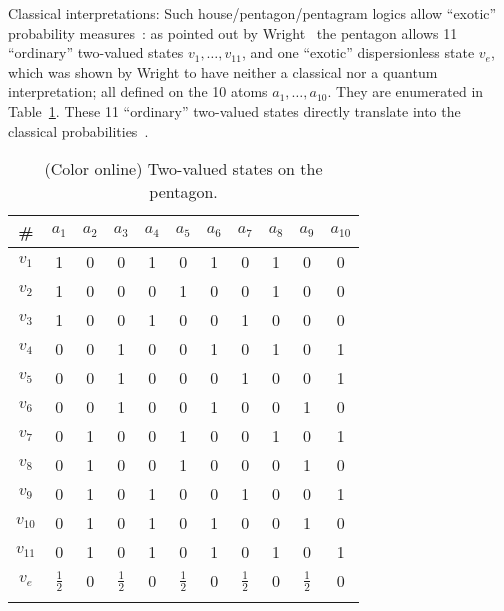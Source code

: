 Classical interpretations:
Such house/pentagon/pentagram logics allow ``exotic'' probability measures~\cite{wright:pent}:
as pointed out by Wright~\cite[p~268]{wright:pent} the pentagon allows 11 ``ordinary'' two-valued states $v_1,\ldots ,v_{11}$,
and one ``exotic'' dispersionless state $v_e$,
which was shown by Wright to have neither a classical nor a quantum interpretation;
all defined on the 10 atoms $a_1, \ldots , a_{10}$.
They are enumerated in Table~\ref{2017-b-t-sotp}.
These 11 ``ordinary'' two-valued states  directly translate into the classical probabilities~\cite[Figure~12.4]{svozil-2016-pu-book}.
 \begin{table}%
 \begin{center}
 \caption{\label{2017-b-t-sotp} (Color online) Two-valued states on the pentagon.}
 \begin{tabular}{ccccccccccc}
\#
&
$a_1$&
$a_2$&
$a_3$&
$a_4$&
$a_5$&
$a_6$&
$a_7$&
$a_8$&
$a_9$&
$a_{10}$
\\
\hline
$v_1$&1&  0&  0&   1&  0&  1&  0&  1&  0&  0 \\
$v_2$&1&  0&  0&   0&  1&  0&  0&  1&  0&  0\\
$v_3$&1&  0&  0&   1&  0&  0&  1&  0&  0&  0\\
$v_4$&0&  0& 1&    0&  0&  1&  0&  1&  0& 1\\
$v_5$&0&  0& 1&    0&  0&  0&  1&  0&  0& 1\\
$v_6$&0&  0& 1&    0&  0&  1&  0&  0&  1&  0\\
$v_7$&0&  1&  0&   0&  1&  0&  0&  1&  0& 1\\
$v_8$&0&  1&  0&   0&  1&  0&  0&  0&  1&  0\\
$v_9$&0&  1&  0&   1&  0&  0&  1&  0&  0& 1\\
$v_{10}$&0& 1&0&   1&  0&  1&  0&  0&  1&  0\\
$v_{11}$&0& 1&0&   1&  0&  1&  0&  1&  0& 1 \\
\hline
$v_e$&$\frac{1}{2}$& 0&  $\frac{1}{2}$& 0&  $\frac{1}{2}$& 0&  $\frac{1}{2}$& 0&  $\frac{1}{2}$& 0
\\ 
 \end{tabular}
 \end{center}
 \end{table}



